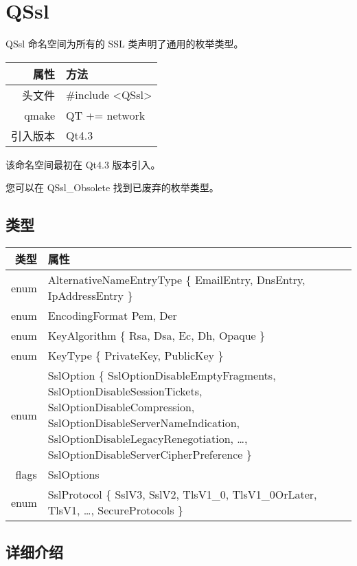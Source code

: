 \chapter{QSsl}

QSsl 命名空间为所有的 SSL 类声明了通用的枚举类型。

\begin{tabular}{|r|l|}
	\hline
	属性 & 方法 \\
	\hline
	头文件 & \#include <QSsl>\\      
	\hline
	qmake & QT += network\\      
	\hline
	引入版本 &	Qt4.3 \\ 
	\hline
\end{tabular}

该命名空间最初在 Qt4.3 版本引入。

\begin{compactitem}
\item 您可以在 QSsl\_Obsolete 找到已废弃的枚举类型。
\end{compactitem}

\section{类型}


\begin{tabular}{|r|m{27em}|}
	\hline 
	类型 	&属性 \\ 
	\hline
enum &	AlternativeNameEntryType \{ EmailEntry, DnsEntry, IpAddressEntry \} \\ 
\hline
enum &	EncodingFormat { Pem, Der } \\ 
\hline
enum &	KeyAlgorithm \{ Rsa, Dsa, Ec, Dh, Opaque \} \\ 
\hline
enum &	KeyType \{ PrivateKey, PublicKey \} \\ 
\hline
enum &	SslOption \{ SslOptionDisableEmptyFragments, SslOptionDisableSessionTickets, SslOptionDisableCompression, SslOptionDisableServerNameIndication, SslOptionDisableLegacyRenegotiation, …, SslOptionDisableServerCipherPreference \} \\ 
\hline
flags &	SslOptions \\ 
\hline
enum &	SslProtocol \{ SslV3, SslV2, TlsV1\_0, TlsV1\_0OrLater, TlsV1, …, SecureProtocols \} \\ 
	\hline 
\end{tabular}



\section{详细介绍}

